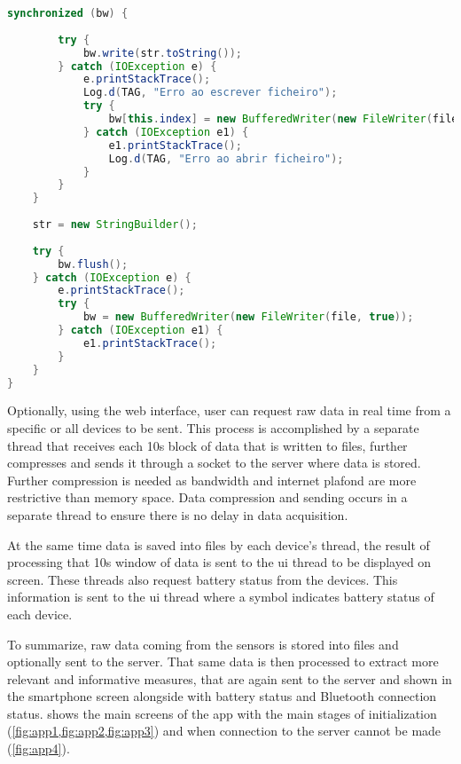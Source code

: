 \begin{lstlisting}[language=Java]
	synchronized (bw) {
	
		try {
			bw.write(str.toString());
		} catch (IOException e) {
			e.printStackTrace();
			Log.d(TAG, "Erro ao escrever ficheiro");
			try {
				bw[this.index] = new BufferedWriter(new FileWriter(files[this.index], true));
			} catch (IOException e1) {
				e1.printStackTrace();
				Log.d(TAG, "Erro ao abrir ficheiro");
			}
		}
	}
	
	str = new StringBuilder();
	
	try {
		bw.flush();
	} catch (IOException e) {
		e.printStackTrace();
		try {
			bw = new BufferedWriter(new FileWriter(file, true));
		} catch (IOException e1) {
			e1.printStackTrace();
		}
	}
}


\end{lstlisting}
\bigskip


Optionally, using the web interface, user can request raw data in real time from a specific or all devices to be sent. This process is accomplished by a separate thread that receives each 10s block of data that is written to files, further compresses and sends it through a socket to the server where data is stored.
Further compression is needed as bandwidth and internet plafond are more restrictive than memory space. Data compression and sending occurs in a separate thread to ensure there is no delay in data acquisition.

At the same time data is saved into files by each device's thread, the result of processing that 10s window of data is sent to the \ac{ui} thread to be displayed on screen. These threads also request battery status from the devices. This information is sent to the \ac{ui} thread where a symbol indicates battery status of each device.

To summarize, raw data coming from the sensors is stored into files and optionally sent to the server. That same data is then processed to extract more relevant and 
informative measures, that are again sent to the server and shown in the smartphone screen alongside with battery status and Bluetooth connection status.  shows the main screens of the app with the main stages of initialization (\cref{fig:app1,fig:app2,fig:app3}) and when connection to the server cannot be made (\cref{fig:app4}).


